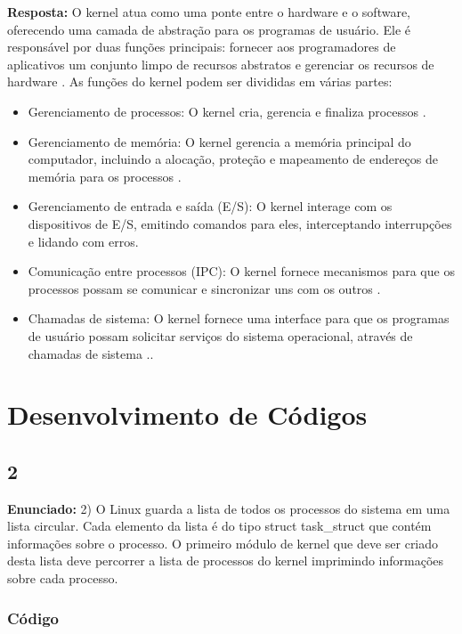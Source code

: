 \documentclass{article}
\begin{document}
\textbf{Resposta:}  O kernel atua como uma ponte entre o hardware e o software, oferecendo uma camada de abstração para os programas de usuário. Ele é responsável por duas funções principais: fornecer aos programadores de aplicativos um conjunto limpo de recursos abstratos e gerenciar os recursos de hardware \parencite[p. 2]{tanenbaum2021}. As funções do kernel podem ser divididas em várias partes:

\begin{itemize}
  \item Gerenciamento de processos: O kernel cria, gerencia e finaliza processos \parencite[p. 506]{tanenbaum2021}.
  \item Gerenciamento de memória: O kernel gerencia a memória principal do computador, incluindo a alocação, proteção e mapeamento de endereços de memória para os processos \parencite[p. 233]{tanenbaum2021}.
  \item Gerenciamento de entrada e saída (E/S): O kernel interage com os dispositivos de E/S, emitindo comandos para eles, interceptando interrupções e lidando com erros.
  \item Comunicação entre processos (IPC): O kernel fornece mecanismos para que os processos possam se comunicar e sincronizar uns com os outros \parencite[p. 604]{tanenbaum2021}.
  \item Chamadas de sistema: O kernel fornece uma interface para que os programas de usuário possam solicitar serviços do sistema operacional, através de chamadas de sistema \parencite[p. 16]{tanenbaum2021}..
\end{itemize}

\section{Desenvolvimento de Códigos}

\subsection{2}

\textbf{Enunciado:} 2)  O Linux guarda a lista de todos os processos do sistema em uma lista circular. Cada elemento da lista é do tipo struct task\_struct que contém informações sobre o processo. O primeiro módulo de kernel que deve ser criado desta lista deve percorrer a lista de processos do kernel imprimindo informações sobre cada processo.\newline

\subsubsection{Código}
\label{sub-sec-cod1}

\end{document}
